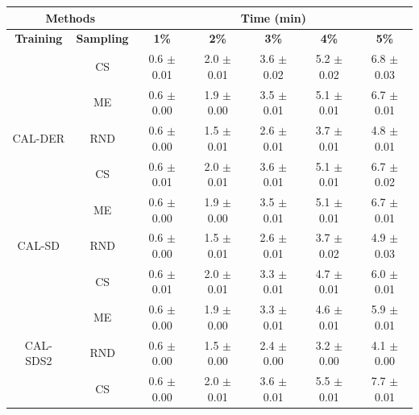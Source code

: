 \begin{table}[htbp]
\centering

\begin{tabular*}{\linewidth}{c|c|@{\extracolsep{\fill}}ccccc}
\toprule
\multicolumn{2}{c|}{\textbf{Methods}} & \multicolumn{5}{c}{\textbf{Time (min)}} \\
\midrule
\textbf{Training} & \textbf{Sampling} & \textbf{1\%} & \textbf{2\%} & \textbf{3\%} & \textbf{4\%} & \textbf{5\%}\\
\midrule
 & CS & 0.6 $\pm$ {\small 0.01} & 2.0 $\pm$ {\small 0.01} & 3.6 $\pm$ {\small 0.02} & 5.2 $\pm$ {\small 0.02} & 6.8 $\pm$ {\small 0.03}\\

 & ME & 0.6 $\pm$ {\small 0.00} & 1.9 $\pm$ {\small 0.00} & 3.5 $\pm$ {\small 0.01} & 5.1 $\pm$ {\small 0.01} & 6.7 $\pm$ {\small 0.01}\\

\multirow{-3}{*}{\raggedright\arraybackslash CAL-DER} & RND & 0.6 $\pm$ {\small 0.00} & 1.5 $\pm$ {\small 0.01} & 2.6 $\pm$ {\small 0.01} & 3.7 $\pm$ {\small 0.01} & 4.8 $\pm$ {\small 0.01}\\
\midrule
 & CS & 0.6 $\pm$ {\small 0.01} & 2.0 $\pm$ {\small 0.01} & 3.6 $\pm$ {\small 0.01} & 5.1 $\pm$ {\small 0.01} & 6.7 $\pm$ {\small 0.02}\\

 & ME & 0.6 $\pm$ {\small 0.00} & 1.9 $\pm$ {\small 0.00} & 3.5 $\pm$ {\small 0.01} & 5.1 $\pm$ {\small 0.01} & 6.7 $\pm$ {\small 0.01}\\

\multirow{-3}{*}{\raggedright\arraybackslash CAL-SD} & RND & 0.6 $\pm$ {\small 0.00} & 1.5 $\pm$ {\small 0.01} & 2.6 $\pm$ {\small 0.01} & 3.7 $\pm$ {\small 0.02} & 4.9 $\pm$ {\small 0.03}\\
\midrule
 & CS & 0.6 $\pm$ {\small 0.01} & 2.0 $\pm$ {\small 0.01} & 3.3 $\pm$ {\small 0.01} & 4.7 $\pm$ {\small 0.01} & 6.0 $\pm$ {\small 0.01}\\

 & ME & 0.6 $\pm$ {\small 0.00} & 1.9 $\pm$ {\small 0.00} & 3.3 $\pm$ {\small 0.01} & 4.6 $\pm$ {\small 0.01} & 5.9 $\pm$ {\small 0.01}\\

\multirow{-3}{*}{\raggedright\arraybackslash CAL-SDS2} & RND & 0.6 $\pm$ {\small 0.00} & 1.5 $\pm$ {\small 0.00} & 2.4 $\pm$ {\small 0.00} & 3.2 $\pm$ {\small 0.00} & 4.1 $\pm$ {\small 0.00}\\
\midrule
 & CS & 0.6 $\pm$ {\small 0.00} & 2.0 $\pm$ {\small 0.01} & 3.6 $\pm$ {\small 0.01} & 5.5 $\pm$ {\small 0.01} & 7.7 $\pm$ {\small 0.01}\\


\end{tabular*}
\end{table}
